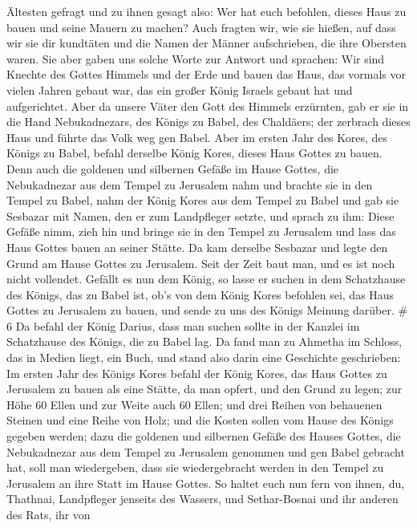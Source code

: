 Ältesten gefragt und zu ihnen gesagt also: Wer hat euch befohlen, dieses
Haus zu bauen und seine Mauern zu machen?  Auch fragten
wir, wie sie hießen, auf dass wir sie dir kundtäten und die Namen der
Männer aufschrieben, die ihre Obersten waren.  Sie aber
gaben uns solche Worte zur Antwort und sprachen: Wir sind Knechte des
Gottes Himmels und der Erde und bauen das Haus, das vormals vor vielen
Jahren gebaut war, das ein großer König Israels gebaut hat und
aufgerichtet.  Aber da unsere Väter den Gott des Himmels
erzürnten, gab er sie in die Hand Nebukadnezars, des Königs zu Babel,
des Chaldäers; der zerbrach dieses Haus und führte das Volk weg gen
Babel.  Aber im ersten Jahr des Kores, des Königs zu Babel,
befahl derselbe König Kores, dieses Haus Gottes zu bauen. 
Denn auch die goldenen und silbernen Gefäße im Hause Gottes, die
Nebukadnezar aus dem Tempel zu Jerusalem nahm und brachte sie in den
Tempel zu Babel, nahm der König Kores aus dem Tempel zu Babel und gab
sie Sesbazar mit Namen, den er zum Landpfleger setzte,  und
sprach zu ihm: Diese Gefäße nimm, zieh hin und bringe sie in den Tempel
zu Jerusalem und lass das Haus Gottes bauen an seiner Stätte.
 Da kam derselbe Sesbazar und legte den Grund am Hause
Gottes zu Jerusalem. Seit der Zeit baut man, und es ist noch nicht
vollendet.  Gefällt es nun dem König, so lasse er suchen in
dem Schatzhause des Königs, das zu Babel ist, ob's von dem König Kores
befohlen sei, das Haus Gottes zu Jerusalem zu bauen, und sende zu uns
des Königs Meinung darüber. \# 6  Da befahl der König
Darius, dass man suchen sollte in der Kanzlei im Schatzhause des Königs,
die zu Babel lag.  Da fand man zu Ahmetha im Schloss, das in
Medien liegt, ein Buch, und stand also darin eine Geschichte
geschrieben:  Im ersten Jahr des Königs Kores befahl der
König Kores, das Haus Gottes zu Jerusalem zu bauen als eine Stätte, da
man opfert, und den Grund zu legen; zur Höhe 60 Ellen und zur Weite auch
60 Ellen;  und drei Reihen von behauenen Steinen und eine
Reihe von Holz; und die Kosten sollen vom Hause des Königs gegeben
werden;  dazu die goldenen und silbernen Gefäße des Hauses
Gottes, die Nebukadnezar aus dem Tempel zu Jerusalem genommen und gen
Babel gebracht hat, soll man wiedergeben, dass sie wiedergebracht werden
in den Tempel zu Jerusalem an ihre Statt im Hause Gottes. 
So haltet euch nun fern von ihnen, du, Thathnai, Landpfleger jenseits
des Wassers, und Sethar-Bosnai und ihr anderen des Rats, ihr von
